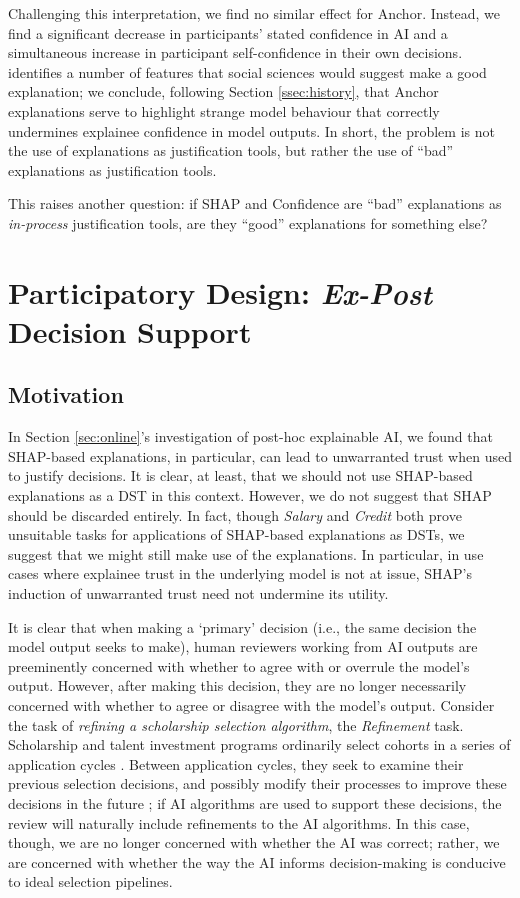 Challenging this interpretation, we find no similar effect for Anchor. Instead, we find a significant decrease in participants' stated confidence in AI and a simultaneous increase in participant self-confidence in their own decisions. \textcite{miller_explanation_2017} identifies a number of features that social sciences would suggest make a good explanation; we conclude, following Section \ref{ssec:history}, that Anchor explanations serve to highlight strange model behaviour that correctly undermines explainee confidence in model outputs. In short, the problem is not the use of explanations as justification tools, but rather the use of ``bad'' explanations as justification tools.

This raises another question: if SHAP and Confidence are ``bad'' explanations as \emph{in-process} justification tools, are they ``good'' explanations for something else?

\section{Participatory Design: \emph{Ex-Post} Decision Support}\label{sec:xaicase}
\subsection{Motivation}
In Section \ref{sec:online}'s investigation of post-hoc explainable AI, we found that SHAP-based explanations, in particular, can lead to unwarranted trust when used to justify decisions. It is clear, at least, that we should not use SHAP-based explanations as a DST in this context. However, we do not suggest that SHAP should be discarded entirely. In fact, though \emph{Salary} and \emph{Credit} both prove unsuitable tasks for applications of SHAP-based explanations as DSTs, we suggest that we might still make use of the explanations. In particular, in use cases where explainee trust in the underlying model is not at issue, SHAP's induction of unwarranted trust need not undermine its utility.

It is clear that when making a `primary' decision (i.e., the same decision the model output seeks to make), human reviewers working from AI outputs are preeminently concerned with whether to agree with or overrule the model's output. However, after making this decision, they are no longer necessarily concerned with whether to agree or disagree with the model's output. Consider the task of \emph{refining a scholarship selection algorithm}, the \emph{Refinement} task. Scholarship and talent investment programs ordinarily select cohorts in a series of application cycles \cite{li2020hiring}. Between application cycles, they seek to examine their previous selection decisions, and possibly modify their processes to improve these decisions in the future \cite{li2020hiring}; if AI algorithms are used to support these decisions, the review will naturally include refinements to the AI algorithms. In this case, though, we are no longer concerned with whether the AI was correct; rather, we are concerned with whether the way the AI informs decision-making is conducive to ideal selection pipelines.


